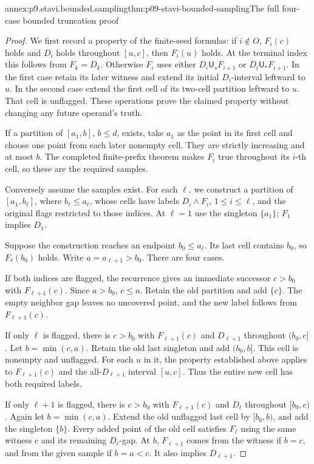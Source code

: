 \begin{annexitem}{annex:p9.stavi.bounded.sampling}{thm:p09-stavi-bounded-sampling}{The full four-case bounded truncation proof}
\begin{proof}
We first record a property of the finite-seed formulas:
if \(i\notin O\), \(F_i(c)\) holds and \(D_i\)
holds throughout \([u,c]\), then \(F_i(u)\)
holds. At the terminal index this follows
from \(F_k=D_k\). Otherwise \(F_i\) uses
either \(D_i\mathbin{\mathsf U_s}F_{i+1}\)
or \(D_i\mathbin{\mathsf U_*}F_{i+1}\).
In the first case retain its later witness
and extend its initial \(D_i\)-interval
leftward to \(u\). In the second case
extend the first cell of its two-cell
partition leftward to \(u\).
That cell is unflagged. These operations
prove the claimed property without
changing any future operand's truth.

If a partition of \([a_1,b]\), \(b\leq d\),
exists, take \(a_1\) as the point in
its first cell and choose one point
from each later nonempty cell.
They are strictly increasing and
at most \(b\). The completed
finite-prefix theorem makes \(F_i\)
true throughout its \(i\)-th cell,
so these are the required samples.

Conversely assume the samples exist.
For each \(\ell\), we construct
a partition of \([a_1,b_\ell]\),
where \(b_\ell\leq a_\ell\),
whose cells have labels
\(D_i\land F_i\), \(1\leq i\leq\ell\),
and the original flags restricted
to those indices. At \(\ell=1\)
use the singleton \(\{a_1\}\);
\(F_1\) implies \(D_1\).

Suppose the construction reaches
an endpoint \(b_0\leq a_\ell\).
Its last cell contains \(b_0\),
so \(F_\ell(b_0)\) holds.
Write \(a=a_{\ell+1}>b_0\).
There are four cases.

If both indices are flagged,
the recurrence gives an
immediate successor \(c>b_0\)
with \(F_{\ell+1}(c)\).
Since \(a>b_0\), \(c\leq a\).
Retain the old partition
and add \(\{c\}\).
The empty neighbor gap
leaves no uncovered point,
and the new label follows
from \(F_{\ell+1}(c)\).

If only \(\ell\) is flagged,
there is \(c>b_0\) with
\(F_{\ell+1}(c)\) and
\(D_{\ell+1}\) throughout
\((b_0,c]\). Let
\(b=\min(c,a)\).
Retain the old last
singleton and add
\((b_0,b]\). This cell
is nonempty and unflagged.
For each \(u\) in it,
the property established
above applies to
\(F_{\ell+1}(c)\) and
the all-\(D_{\ell+1}\)
interval \([u,c]\).
Thus the entire new
cell has both required
labels.

If only \(\ell+1\) is flagged,
there is \(c>b_0\) with
\(F_{\ell+1}(c)\) and
\(D_\ell\) throughout
\([b_0,c)\). Again let
\(b=\min(c,a)\).
Extend the old unflagged
last cell by \([b_0,b)\),
and add the singleton
\(\{b\}\). Every added
point of the old cell
satisfies \(F_\ell\)
using the same witness
\(c\) and its remaining
\(D_\ell\)-gap.
At \(b\), \(F_{\ell+1}\)
comes from the witness
if \(b=c\), and from
the given sample if
\(b=a<c\). It also
implies \(D_{\ell+1}\).


\end{proof}
\end{annexitem}
